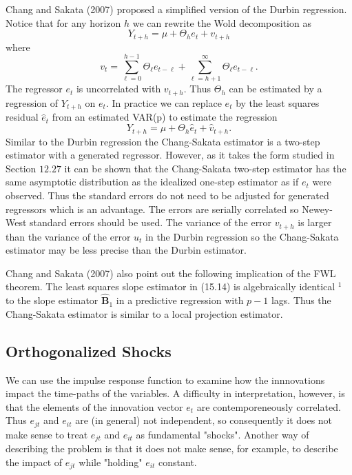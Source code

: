\documentclass[10pt]{article}
\begin{document}
Chang and Sakata (2007) proposed a simplified version of the Durbin regression. Notice that for any horizon $h$ we can rewrite the Wold decomposition as
$$
Y_{t+h}=\mu+\Theta_{h} e_{t}+v_{t+h}
$$
where
$$
v_{t}=\sum_{\ell=0}^{h-1} \Theta_{\ell} e_{t-\ell}+\sum_{\ell=h+1}^{\infty} \Theta_{\ell} e_{t-\ell} .
$$
The regressor $e_{t}$ is uncorrelated with $v_{t+h}$. Thus $\Theta_{h}$ can be estimated by a regression of $Y_{t+h}$ on $e_{t}$. In practice we can replace $e_{t}$ by the least squares residual $\widehat{e}_{t}$ from an estimated VAR(p) to estimate the regression
$$
Y_{t+h}=\mu+\Theta_{h} \widehat{e}_{t}+\widehat{v}_{t+h} .
$$
Similar to the Durbin regression the Chang-Sakata estimator is a two-step estimator with a generated regressor. However, as it takes the form studied in Section $12.27$ it can be shown that the Chang-Sakata two-step estimator has the same asymptotic distribution as the idealized one-step estimator as if $e_{t}$ were observed. Thus the standard errors do not need to be adjusted for generated regressors which is an advantage. The errors are serially correlated so Newey-West standard errors should be used. The variance of the error $v_{t+h}$ is larger than the variance of the error $u_{t}$ in the Durbin regression so the Chang-Sakata estimator may be less precise than the Durbin estimator.

Chang and Sakata (2007) also point out the following implication of the FWL theorem. The least squares slope estimator in (15.14) is algebraically identical ${ }^{1}$ to the slope estimator $\widehat{\boldsymbol{B}}_{1}$ in a predictive regression with $p-1$ lags. Thus the Chang-Sakata estimator is similar to a local projection estimator.

\subsection{Orthogonalized Shocks}
We can use the impulse response function to examine how the innnovations impact the time-paths of the variables. A difficulty in interpretation, however, is that the elements of the innovation vector $e_{t}$ are contemporeneously correlated. Thus $e_{j t}$ and $e_{i t}$ are (in general) not independent, so consequently it does not make sense to treat $e_{j t}$ and $e_{i t}$ as fundamental "shocks". Another way of describing the problem is that it does not make sense, for example, to describe the impact of $e_{j t}$ while "holding" $e_{i t}$ constant.
\end{document}
